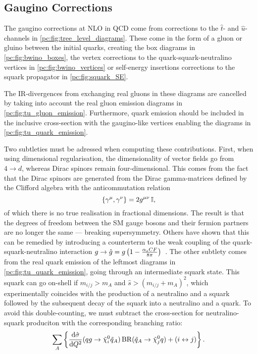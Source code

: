 \documentclass[../main.tex]{subfiles}
\begin{document}
\subsection{Gaugino Corrections}
The gaugino corrections at NLO in QCD come from corrections to the \(\hat{t}\)- and \(\hat{u}\)-channels in \cref{pc:fig:tree_level_diagrams}.
These come in the form of a gluon or gluino between the initial quarks, creating the box diagrams in \cref{pc:fig:bwino_boxes}, the vertex corrections to the quark-squark-neutralino vertices in \cref{pc:fig:bwino_vertices} or self-energy insertions corrections to the squark propagator in \cref{pc:fig:squark_SE}.

The IR-divergences from exchanging real gluons in these diagrams are cancelled by taking into account the real gluon emission diagrams in \cref{pc:fig:tu_gluon_emission}. Furthermore, quark emission should be included in the inclusive cross-section with the gaugino-like vertices enabling the diagrams in \cref{pc:fig:tu_quark_emission}.
\medskip

Two subtleties must be adressed when computing these contributions.
First, when using dimensional regularisation, the dimensionality of vector fields go from \(4 \to d\), whereas Dirac spinors remain four-dimensional.
This comes from the fact that the Dirac spinors are generated from the Dirac gamma-matrices defined by the Clifford algebra with the anticommutation relation
\begin{equation}
  \cclosed{\gamma\^\mu, \gamma\^\nu} = 2\g \eye,
\end{equation}
of which there is no true realisation in fractional dimensions.
The result is that the degrees of freedom between the SM gauge bosons and their fermion partners are no longer the same --- breaking supersymmetry.
Others have shown that this can be remedied by introducing a counterterm to the weak coupling of the quark-squark-neutralino interaction \(g \to \hat{g} = g\pclosed{1 - \frac{\alpha_s CF}{8\pi}}\)~\cite{Aguilar-Saavedra:2005zyz}.
The other subtlety comes from the real quark emission of the leftmost diagrams in \cref{pc:fig:tu_quark_emission}, going through an intermediate squark state.
This squark can go on-shell if \(m_{i/j} > m_A\) and \(\hat{s} > (m_{i/j} + m_A)^2\), which experimentally coincides with the production of a neutralino and a squark followed by the subsequent decay of the squark into a neutralino and a quark.
To avoid this double-counting, we must subtract the cross-section for neutralino-squark produciton with the corresponding branching ratio:
\begin{equation}
  \sum_A \cclosed{\d[Q^2]{\hat\sigma}(qg \to \tilde\chi^0_i \tilde{q}_A) \operatorname{BR}(\tilde{q}_A \to \tilde\chi^0_j q) + (i \leftrightarrow j)}.
\end{equation}
\end{document}
